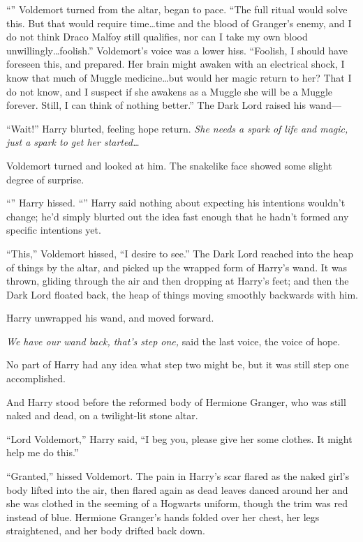 “” Voldemort turned from the altar, began to pace. “The full ritual would solve this. But that would require time…time and the blood of Granger’s enemy, and I do not think Draco Malfoy still qualifies, nor can I take my own blood unwillingly…foolish.” Voldemort’s voice was a lower hiss. “Foolish, I should have foreseen this, and prepared. Her brain might awaken with an electrical shock, I know that much of Muggle medicine…but would her magic return to her? That I do not know, and I suspect if she awakens as a Muggle she will be a Muggle forever. Still, I can think of nothing better.” The Dark Lord raised his wand—

“Wait!” Harry blurted, feeling hope return. \emph{She needs a spark of life and magic, just a spark to get her started…}

Voldemort turned and looked at him. The snakelike face showed some slight degree of surprise.

“” Harry hissed. “” Harry said nothing about expecting his intentions wouldn’t change; he’d simply blurted out the idea fast enough that he hadn’t formed any specific intentions yet.

“This,” Voldemort hissed, “I desire to see.” The Dark Lord reached into the heap of things by the altar, and picked up the wrapped form of Harry’s wand. It was thrown, gliding through the air and then dropping at Harry’s feet; and then the Dark Lord floated back, the heap of things moving smoothly backwards with him.

Harry unwrapped his wand, and moved forward.

\emph{We have our wand back, that’s step one,} said the last voice, the voice of hope.

No part of Harry had any idea what step two might be, but it was still step one accomplished.

And Harry stood before the reformed body of Hermione Granger, who was still naked and dead, on a twilight-lit stone altar.

“Lord Voldemort,” Harry said, “I beg you, please give her some clothes. It might help me do this.”

“Granted,” hissed Voldemort. The pain in Harry’s scar flared as the naked girl’s body lifted into the air, then flared again as dead leaves danced around her and she was clothed in the seeming of a Hogwarts uniform, though the trim was red instead of blue. Hermione Granger’s hands folded over her chest, her legs straightened, and her body drifted back down.

